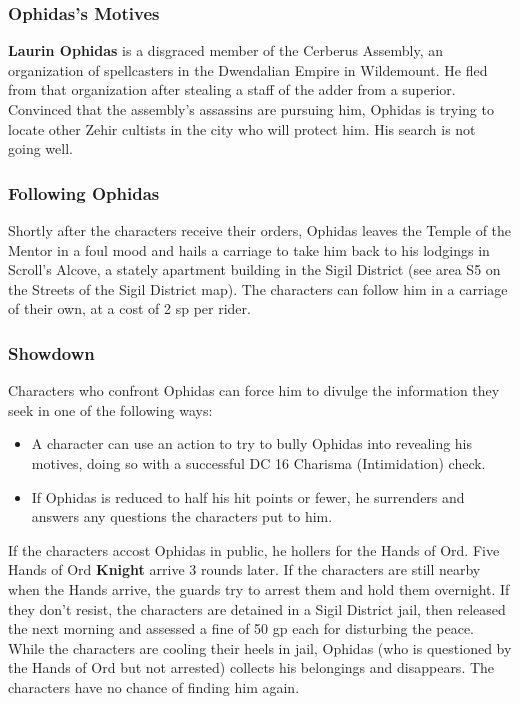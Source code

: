 \documentclass[10pt,a4,twoside,twocolumn,openany,nodeprecatedcode]{dndbook}
\begin{document}
\subsubsection{Ophidas's Motives}
\textbf{Laurin Ophidas} is a disgraced member of the Cerberus Assembly, an organization of spellcasters in the Dwendalian Empire in Wildemount. He fled from that organization after stealing a staff of the adder from a superior. Convinced that the assembly's assassins are pursuing him, Ophidas is trying to locate other Zehir cultists in the city who will protect him. His search is not going well.
\subsubsection{Following Ophidas}
Shortly after the characters receive their orders, Ophidas leaves the Temple of the Mentor in a foul mood and hails a carriage to take him back to his lodgings in Scroll's Alcove, a stately apartment building in the Sigil District (see area S5 on the Streets of the Sigil District map). The characters can follow him in a carriage of their own, at a cost of 2 sp per rider.
\subsubsection{Showdown}
Characters who confront Ophidas can force him to divulge the information they seek in one of the following ways:
\begin{itemize}

\item A character can use an action to try to bully Ophidas into revealing his motives, doing so with a successful DC 16 Charisma (Intimidation) check.
\item If Ophidas is reduced to half his hit points or fewer, he surrenders and answers any questions the characters put to him.
\end{itemize}


If the characters accost Ophidas in public, he hollers for the Hands of Ord. Five Hands of Ord \textbf{Knight} arrive 3 rounds later. If the characters are still nearby when the Hands arrive, the guards try to arrest them and hold them overnight. If they don't resist, the characters are detained in a Sigil District jail, then released the next morning and assessed a fine of 50 gp each for disturbing the peace. While the characters are cooling their heels in jail, Ophidas (who is questioned by the Hands of Ord but not arrested) collects his belongings and disappears. The characters have no chance of finding him again.
\end{document}
